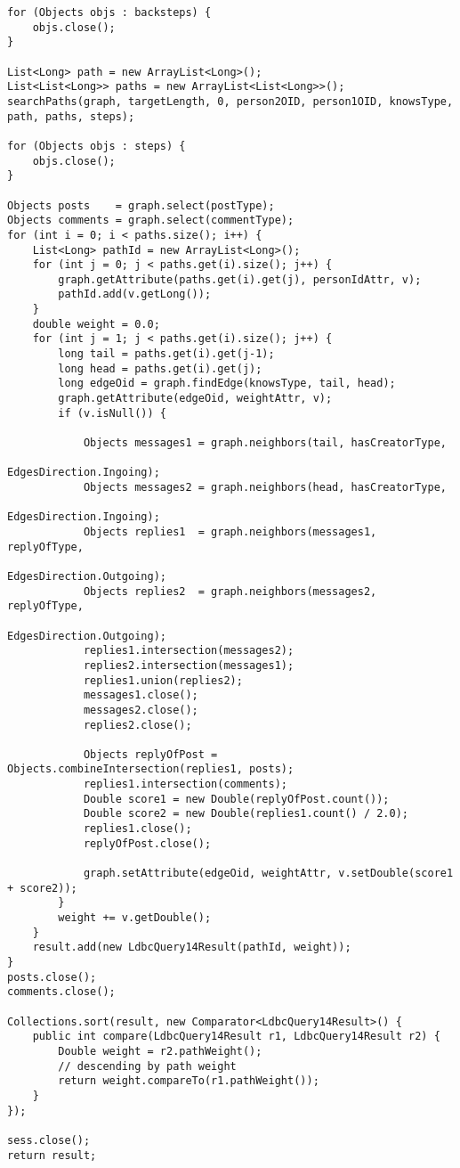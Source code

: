 {\begin{verbatim}
for (Objects objs : backsteps) {
    objs.close();
}

List<Long> path = new ArrayList<Long>();
List<List<Long>> paths = new ArrayList<List<Long>>();
searchPaths(graph, targetLength, 0, person2OID, person1OID, knowsType, path, paths, steps);

for (Objects objs : steps) {
    objs.close();
}

Objects posts    = graph.select(postType);
Objects comments = graph.select(commentType);
for (int i = 0; i < paths.size(); i++) {
    List<Long> pathId = new ArrayList<Long>();
    for (int j = 0; j < paths.get(i).size(); j++) {
        graph.getAttribute(paths.get(i).get(j), personIdAttr, v);
        pathId.add(v.getLong());
    }
    double weight = 0.0;
    for (int j = 1; j < paths.get(i).size(); j++) {
        long tail = paths.get(i).get(j-1);
        long head = paths.get(i).get(j);
        long edgeOid = graph.findEdge(knowsType, tail, head);
        graph.getAttribute(edgeOid, weightAttr, v);
        if (v.isNull()) {

            Objects messages1 = graph.neighbors(tail, hasCreatorType, 
                                                EdgesDirection.Ingoing);
            Objects messages2 = graph.neighbors(head, hasCreatorType, 
                                                EdgesDirection.Ingoing);
            Objects replies1  = graph.neighbors(messages1, replyOfType, 
                                                EdgesDirection.Outgoing);
            Objects replies2  = graph.neighbors(messages2, replyOfType, 
                                                EdgesDirection.Outgoing);
            replies1.intersection(messages2);
            replies2.intersection(messages1);
            replies1.union(replies2);
            messages1.close();
            messages2.close();
            replies2.close();

            Objects replyOfPost = Objects.combineIntersection(replies1, posts);
            replies1.intersection(comments);
            Double score1 = new Double(replyOfPost.count());
            Double score2 = new Double(replies1.count() / 2.0);
            replies1.close();
            replyOfPost.close();

            graph.setAttribute(edgeOid, weightAttr, v.setDouble(score1 + score2));
        }
        weight += v.getDouble();
    }
    result.add(new LdbcQuery14Result(pathId, weight));
}
posts.close();
comments.close();

Collections.sort(result, new Comparator<LdbcQuery14Result>() {
    public int compare(LdbcQuery14Result r1, LdbcQuery14Result r2) {
        Double weight = r2.pathWeight();
        // descending by path weight
        return weight.compareTo(r1.pathWeight()); 
    }
});

sess.close();
return result;

\end{verbatim}
}


